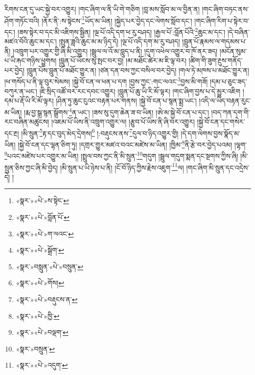 རིགས་ངན་དུ་ཡང་སྐྱེ་བར་འགྱུར། །གང་ཞིག་ལ་ནི་ཡི་གེ་གཅིག །བླ་མས་སློབ་མ་ལ་བྱིན་ན། །གང་ཞིག་བཏང་ནས་ཤོག་གཏོང་བའི། །ནོར་ནི་:ས་སྟེངས་\footnote{«སྣར་»«པེ་»ས་སྟེང་}ཡོད་མ་ཡིན། །སྐྱེད་པར་བྱེད་དང་ལེགས་སློབ་དང་། །གང་ཞིག་རིག་པ་སྟེར་བ་དང་། །ཟས་སྟེར་བ་དང་མི་འཇིགས་སྦྱིན། །ལྔ་པོ་འདི་དག་ཕ་རུ་བཤད། །རྒྱལ་པོ་:བློན་པོའི་\footnote{«སྣར་»«པེ་»བློན་པོ་}ཆུང་མ་དང་། །དེ་བཞིན་མཛའ་བོའི་ཆུང་མ་དང་། །སྤུན་ཟླའི་ཆུང་མ་མ་ཉིད་དེ། །ལྔ་པོ་འདི་དག་མ་རུ་བཤད། །བླུན་པོ་རྣམས་ལ་གདམས་པ་ནི། །འཁྲུག་པར་འགྱུར་གྱི་ཞི་མི་འགྱུར། །སྦྲུལ་ལ་འོ་མ་བླུད་པ་ནི། །དུག་འཕེལ་འགྱུར་བ་ཁོ་ནར་ཟད། །མངོན་སུམ་པ་ཡི་རྐང་གཉིས་ཕྱུགས། །བླུན་པོ་ཡོངས་སུ་སྤང་བར་བྱ། །མ་མཐོང་ཚེར་མ་ཇི་ལྟ་བར། །ཚིག་གི་ཟུག་རྔུས་གནོད་པར་བྱེད། །བླུན་པོས་བླུན་པོ་མཐོང་གྱུར་ན། །ཙན་དན་བས་ཀྱང་བསིལ་བར་བྱེད། །གལ་ཏེ་མཁས་པ་མཐོང་གྱུར་ན། །ཕ་གསོད་པ་ནི་ལྟ་བུར་སེམས། །སྐྱེ་བོ་ངན་ལ་ཕན་པ་དག །བྱས་ཀྱང་:གང་ལའང་\footnote{«སྣར་»«པེ་»ག་ལའང་}བྱས་མི་གཟོ། །དམ་པ་ཅུང་ཟད་བཀུར་ན་ཡང་། །ཇི་སྲིད་འཚོ་བར་རང་དབང་འགྱུར། །བླུན་པོ་ཆུ་ཡི་རི་མོ་ལྟར། །གང་ཞིག་བྱས་པ་དེ་མྱུར་འཇིག །དམ་པ་རྡོ་ཡི་རི་མོ་ལྟར། །ཤིན་ཏུ་ཆུང་ངུའང་བརྟན་པར་གནས། །སྐྱེ་བོ་ངན་པ་སྙན་སྨྲ་ཡང་། །འདི་ལ་ཡིད་བརྟན་རུང་མ་ཡིན། །རྨ་བྱ་སྒྲ་སྙན་སྒྲོགས་\footnote{«སྣར་»«པེ་»སྒྲོག་}ན་ཡང་། །ཟས་སུ་དུག་ཆེན་ཟ་བ་ཡིན། །ཨེ་མ་སྐྱེ་བོ་ངན་པ་དང་། །བད་ཀན་དག་གི་རང་བཞིན་མཚུངས། །འཇམ་པོ་ཡིས་ནི་འཁྲུག་འགྱུར་ལ། །རྩུབ་པོ་ཡིས་ནི་ཞི་བར་འགྱུར། །སྐྱེ་བོ་ངན་དང་གསེར་དང་རྔ། །མི་སྲུན་\footnote{«སྣར་»བསླུན་«པེ་»བསྲུན་}རྟ་དང་བུད་མེད་དྲེགས།\footnote{«སྣར་»«པེ་»གོས།} །:བརྡུངས་ནས་\footnote{«སྣར་»«པེ་»བརྡུངས་ན་}དུལ་བ་ཉིད་འགྱུར་གྱི། །དེ་དག་ལེགས་བྱས་སྣོད་མ་ཡིན། །སྐྱེ་བོ་ངན་དང་ལྷན་ཅིག་ཏུ། །དགྲར་གྱུར་མཛའ་བའང་མཛེས་མ་ཡིན། །ཁྱིམ་\footnote{«སྣར་»«པེ་»ཁྱི་}ནི་རྩེ་བར་བྱེད་པའམ། །ལྷག་\footnote{«སྣར་»«པེ་»བལྡག་}པའང་མཛེས་པར་འགྱུར་མ་ཡིན། །སྤྲུལ་བས་ཀྱང་ནི་མི་སྲུན་\footnote{«སྣར་»བསྲུན་}གདུག །སྦྲུལ་གདུག་སྨན་དང་སྔགས་ཀྱིས་ཞི། །མི་སྲུན་ཅིས་ཀྱང་ཞི་མི་བྱེད། །མི་སྲུན་པ་ཡི་ཉེས་པ་ནི། །ངོ་བོ་ཉིད་ཀྱིས་རྗེས་འཇུག་\footnote{«སྣར་»«པེ་»འདུག་}ལ། །གང་ཞིག་མི་སྲུན་དང་འདྲེས་དེ། །
